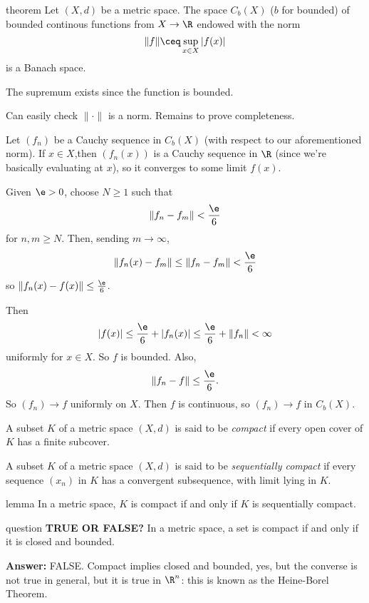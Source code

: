 \documentclass[class=article, crop=false]{standalone}
\begin{document}
\begin{result}{theorem}
  Let $(X,d)$ be a metric space. The space $C_b(X)$ ($b$ for bounded) of bounded continous functions from $X \to \R$ endowed with the norm
    \[
      \|f\| \ceq \sup_{x \in X} |f(x)|
    \]
  is a Banach space.
\end{result}
\begin{rem}
  The supremum exists since the function is bounded.
\end{rem}
\begin{pf}
  Can easily check $\|\cdot\|$ is a norm. Remains to prove completeness.

  Let $(f_n)$ be a Cauchy sequence in $C_b(X)$ (with respect to our aforementioned norm). If $x \in X$,then $(f_n(x))$ is a Cauchy sequence in $\R$ (since we're basically evaluating at $x$), so it converges to some limit $f(x)$.

  Given $\e > 0$, choose $N \geq 1$ such that
    \[
      \|f_n-f_m\| < \frac{\e}{6}
    \]
  for $n,m \geq N$. Then, sending $m \to \infty$,
    \[
      \|f_n(x) -f_m\| \leq \|f_n-f_m\| < \frac{\e}{6}
    \]
  so $\|f_n(x)-f(x)\|\leq \frac{\e}{6}$.

  Then
    \[
      |f(x)| \leq \frac{\e}{6} + |f_n(x)| \leq \frac{\e}{6} + \|f_n\| < \infty
    \]
  uniformly for $x \in X$. So $f$ is bounded. Also,
    \[
      \|f_n-f\| \leq \frac{\e}{6}.
    \]
  So $(f_n) \to f$ uniformly on $X$. Then $f$ is continuous, so $(f_n) \to f$ in $C_b(X)$.
\end{pf}

\begin{defn}
  A subset $K$ of a metric space $(X,d)$ is said to be \emph{compact} if every open cover of $K$ has a finite subcover.
\end{defn}

\begin{defn}
  A subset $K$ of a metric space $(X,d)$ is said to be \emph{sequentially compact} if every sequence $(x_n)$ in $K$ has a convergent subsequence, with limit lying in $K$.
\end{defn}

\begin{result}{lemma}
  In a metric space, $K$ is compact if and only if $K$ is sequentially compact.
\end{result}

\begin{understandingcheck}{question}
  \textbf{TRUE OR FALSE?} In a metric space, a set is compact if and only if it is closed and bounded.

  \textbf{Answer:} FALSE. Compact implies closed and bounded, yes, but the converse is not true in general, but it is true in $\R^n$: this is known as the Heine-Borel Theorem.
\end{understandingcheck}
\end{document}
